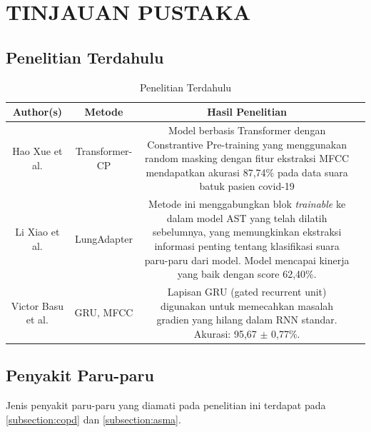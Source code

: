 \chapter{TINJAUAN PUSTAKA}


\section{Penelitian Terdahulu}
\begin{table}[h]
    \centering
    \caption{Penelitian Terdahulu}
    \begin{tabular}{c c c c}
        \hline
        \textbf{Author(s)} & \textbf{Metode} & \textbf{Hasil Penelitian} \\ \hline
        Hao Xue et al.\cite{Xue_2021} & Transformer-CP & 
        \begin{minipage}[t]{0.5\textwidth}
            \raggedright
            Model berbasis Transformer dengan Constrantive Pre-training yang menggunakan random masking dengan fitur ekstraksi MFCC mendapatkan akurasi 87,74\% pada data suara batuk pasien covid-19
        \end{minipage} \\ \hline
        Li Xiao et al.\cite{xiao2024lungadapter} & LungAdapter &
        \begin{minipage}[t]{0.5\textwidth}
            \raggedright
            Metode ini menggabungkan blok \textit{trainable} ke dalam model AST yang telah dilatih sebelumnya, yang memungkinkan ekstraksi informasi penting tentang klasifikasi suara paru-paru dari model. Model mencapai kinerja yang baik dengan score 62,40\%.
        \end{minipage}\\ \hline
        Victor Basu et al.\cite{9080747} & GRU, MFCC &
        \begin{minipage}[t]{0.5\textwidth}
            \raggedright
            Lapisan GRU (gated recurrent unit) digunakan untuk memecahkan masalah gradien yang hilang dalam RNN standar. Akurasi: 95,67 $\pm$ 0,77\%.
        \end{minipage}\\ \hline
    \end{tabular}
    \label{tab:previous_research}
\end{table}

\section{Penyakit Paru-paru}
Jenis penyakit paru-paru yang diamati pada penelitian ini terdapat pada \ref{subsection:copd} dan \ref{subsection:asma}.
